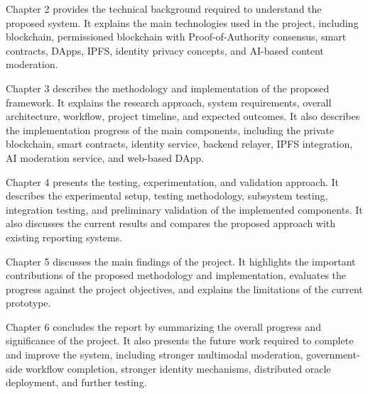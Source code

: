 Chapter 2 provides the technical background required to understand the proposed system. It explains the main technologies used in the project, including blockchain, permissioned blockchain with Proof-of-Authority consensus, smart contracts, DApps, IPFS, identity privacy concepts, and AI-based content moderation.

Chapter 3 describes the methodology and implementation of the proposed framework. It explains the research approach, system requirements, overall architecture, workflow, project timeline, and expected outcomes. It also describes the implementation progress of the main components, including the private blockchain, smart contracts, identity service, backend relayer, IPFS integration, AI moderation service, and web-based DApp.

Chapter 4 presents the testing, experimentation, and validation approach. It describes the experimental setup, testing methodology, subsystem testing, integration testing, and preliminary validation of the implemented components. It also discusses the current results and compares the proposed approach with existing reporting systems.

Chapter 5 discusses the main findings of the project. It highlights the important contributions of the proposed methodology and implementation, evaluates the progress against the project objectives, and explains the limitations of the current prototype.

Chapter 6 concludes the report by summarizing the overall progress and significance of the project. It also presents the future work required to complete and improve the system, including stronger multimodal moderation, government-side workflow completion, stronger identity mechanisms, distributed oracle deployment, and further testing.